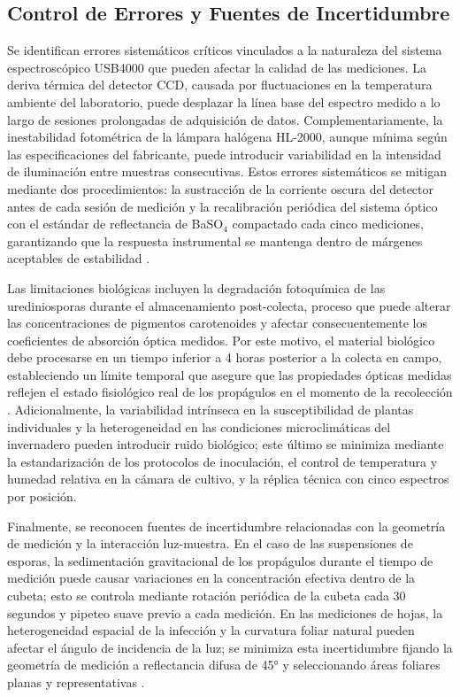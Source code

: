 \documentclass[12pt, a4paper]{article}
\begin{document}
	\subsection{Control de Errores y Fuentes de Incertidumbre}
	
	Se identifican errores sistemáticos críticos vinculados a la naturaleza del sistema espectroscópico USB4000 que pueden afectar la calidad de las mediciones. La deriva térmica del detector CCD, causada por fluctuaciones en la temperatura ambiente del laboratorio, puede desplazar la línea base del espectro medido a lo largo de sesiones prolongadas de adquisición de datos. Complementariamente, la inestabilidad fotométrica de la lámpara halógena HL-2000, aunque mínima según las especificaciones del fabricante, puede introducir variabilidad en la intensidad de iluminación entre muestras consecutivas. Estos errores sistemáticos se mitigan mediante dos procedimientos: la sustracción de la corriente oscura del detector antes de cada sesión de medición y la recalibración periódica del sistema óptico con el estándar de reflectancia de BaSO$_4$ compactado cada cinco mediciones, garantizando que la respuesta instrumental se mantenga dentro de márgenes aceptables de estabilidad \parencite{lichtenthaler2001}.
	
	Las limitaciones biológicas incluyen la degradación fotoquímica de las urediniosporas durante el almacenamiento post-colecta, proceso que puede alterar las concentraciones de pigmentos carotenoides y afectar consecuentemente los coeficientes de absorción óptica medidos. Por este motivo, el material biológico debe procesarse en un tiempo inferior a 4 horas posterior a la colecta en campo, estableciendo un límite temporal que asegure que las propiedades ópticas medidas reflejen el estado fisiológico real de los propágulos en el momento de la recolección \parencite{Talhinhas2017}. Adicionalmente, la variabilidad intrínseca en la susceptibilidad de plantas individuales y la heterogeneidad en las condiciones microclimáticas del invernadero pueden introducir ruido biológico; este último se minimiza mediante la estandarización de los protocolos de inoculación, el control de temperatura y humedad relativa en la cámara de cultivo, y la réplica técnica con cinco espectros por posición.
	
	Finalmente, se reconocen fuentes de incertidumbre relacionadas con la geometría de medición y la interacción luz-muestra. En el caso de las suspensiones de esporas, la sedimentación gravitacional de los propágulos durante el tiempo de medición puede causar variaciones en la concentración efectiva dentro de la cubeta; esto se controla mediante rotación periódica de la cubeta cada 30 segundos y pipeteo suave previo a cada medición. En las mediciones de hojas, la heterogeneidad espacial de la infección y la curvatura foliar natural pueden afectar el ángulo de incidencia de la luz; se minimiza esta incertidumbre fijando la geometría de medición a reflectancia difusa de 45° y seleccionando áreas foliares planas y representativas \parencite{Gold2020}.
	
\end{document}
